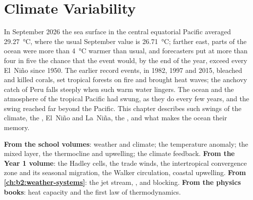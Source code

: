 \chapter{Climate Variability}\label{ch:b2:climate-variability}

In September 2026 the sea surface in the central equatorial Pacific averaged \qty{29.27}{\celsius},
where the usual September value is \qty{26.71}{\celsius}; farther east, parts of the ocean were
more than \qty{4}{\celsius} warmer than usual, and forecasters put at more than four in five the
chance that the event would, by the end of the year, exceed every El~Niño since 1950. The earlier
record events, in 1982, 1997 and 2015, bleached and killed corals, set tropical forests on fire
and brought heat waves; the anchovy catch of Peru falls steeply when such warm water lingers. The
ocean and the atmosphere of the tropical Pacific had swung, as they do every few years, and the
swing reached far beyond the Pacific. This
chapter describes such swings of the climate, the , El~Niño and La~Niña, the , and what makes the ocean their memory.

\begin{recall}
\textbf{From the school volumes}: weather and climate; the temperature anomaly; the mixed layer,
the thermocline and upwelling; the climate feedback. \textbf{From the Year 1 volume}: the Hadley
cells, the trade winds, the intertropical convergence zone and its seasonal migration, the Walker
circulation, coastal upwelling. \textbf{From \cref{ch:b2:weather-systems}}: the jet stream,
,  and blocking. \textbf{From the physics books}: heat capacity
and the first law of thermodynamics.
\end{recall}

